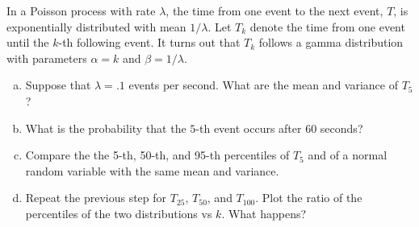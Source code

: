 \begin{frame}

\begin{block}{\exercise}

In a Poisson process with rate $\lambda$, the time from one event to the next event, $T$, is exponentially distributed with mean $1/\lambda$. Let $T_k$ denote the time from one event until the $k$-th following event. It turns out that $T_k$ follows a gamma distribution with parameters $\alpha = k$ and $\beta=1/\lambda$. 

\begin{enumerate}[a)]
\item Suppose that $\lambda=.1$ events per second. What are the mean and variance of $T_5$?
\item What is the probability that the $5$-th event occurs after 60 seconds?
\item Compare the the 5-th, 50-th, and 95-th percentiles of $T_5$ and of a normal random variable with the same mean and variance.
\item Repeat the previous step for $T_25$, $T_50$, and $T_100$. Plot the ratio of the percentiles of the two distributions vs $k$. What happens?
\end{enumerate}
\end{block}

\end{frame}

